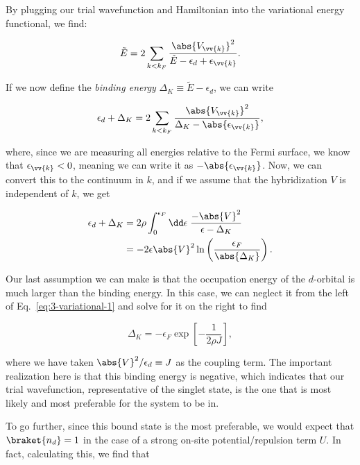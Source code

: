 By plugging our trial wavefunction and Hamiltonian into the variational energy functional, we find:

\begin{equation}
  \tilde{E} = 2\sum_{k<k_F} \frac{\abs{V_{\vv{k}}}^2}{\tilde{E} - \epsilon_d + \epsilon_{\vv{k}}}.
\end{equation}

If we now define the \textit{binding energy} $\Delta_K \equiv \tilde{E} - \epsilon_d$, we can write

\begin{equation}
  \epsilon_d + \Delta_K = 2\sum_{k<k_F} \frac{\abs{V_{\vv{k}}}^2}{\Delta_K - \abs{\epsilon_{\vv{k}}}},
\end{equation}

where, since we are measuring all energies relative to the Fermi surface, we know that $\epsilon_{\vv{k}}<0$, meaning we can write it as $-\abs{\epsilon_{\vv{k}}}$. Now, we can convert this to the continuum in $k$, and if we assume that the hybridization $V$ is independent of $k$, we get

\begin{align}
  \epsilon_d + \Delta_K &= 2\rho \int_0^{\epsilon_F}\dd\epsilon \; \frac{-\abs{V}^2}{\epsilon - \Delta_K} \\
                        &= -2\epsilon\abs{V}^2 \ln\left( \frac{\epsilon_F}{\abs{\Delta_K}} \right).\label{eq:3-variational-1}
\end{align}

Our last assumption we can make is that the occupation energy of the $d$-orbital is much larger than the binding energy. In this case, we can neglect it from the left of Eq.~\eqref{eq:3-variational-1} and solve for it on the right to find

\begin{equation}
  \Delta_K = -\epsilon_F \exp\left[ -\frac{1}{2\rho J} \right],
\end{equation}

where we have taken $\abs{V}^2/\epsilon_d \equiv J$ as the coupling term. The important realization here is that this binding energy is negative, which indicates that our trial wavefunction, representative of the singlet state, is the one that is most likely and most preferable for the system to be in.

To go further, since this bound state is the most preferable, we would expect that $\braket{n_d} = 1$ in the case of a strong on-site potential/repulsion term $U$. In fact, calculating this, we find that

